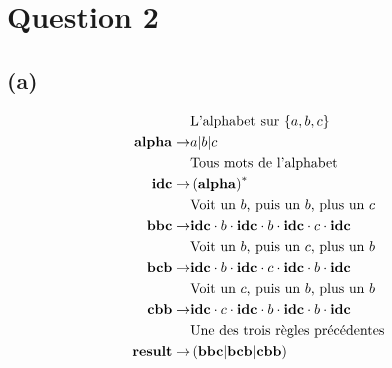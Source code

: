\documentclass[class=article]{standalone}
\begin{document}
\section*{Question 2}
\subsection*{(a)}
\begin{align*}
    &\text{L'alphabet sur $\left \{ a,b,c \right \}$}\\
    {\bf{alpha}} \rightarrow& a|b|c\\
    &\text{Tous mots de l'alphabet}\\
    {\bf{idc}} \rightarrow& \left ( {\bf{alpha}} \right )^*\\
    &\text{Voit un $b$, puis un $b$, plus un $c$}\\
    {\bf{bbc}} \rightarrow& {\bf{idc}}\cdot b \cdot{\bf{idc}}\cdot b\cdot{\bf{idc}}\cdot c\cdot{\bf{idc}}\\
    &\text{Voit un $b$, puis un $c$, plus un $b$}\\
    {\bf{bcb}} \rightarrow& {\bf{idc}}\cdot b\cdot{\bf{idc}}\cdot c\cdot{\bf{idc}}\cdot b\cdot{\bf{idc}}\\
    &\text{Voit un $c$, puis un $b$, plus un $b$}\\
    {\bf{cbb}} \rightarrow& {\bf{idc}}\cdot c\cdot{\bf{idc}}\cdot b\cdot{\bf{idc}}\cdot b\cdot{\bf{idc}}\\
    &\text{Une des trois règles précédentes}\\
    {\bf{result}} \rightarrow& \left ( {\bf{bbc}} | {\bf{bcb}} | {\bf{cbb}} \right )
\end{align*}
\end{document}
